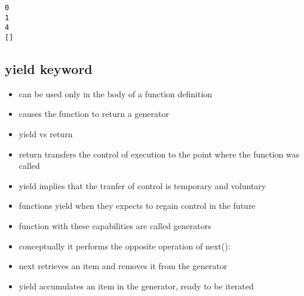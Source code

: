 \documentclass[11pt]{article}
\providecommand{\tightlist}{%
      \setlength{\itemsep}{0pt}\setlength{\parskip}{0pt}}
\begin{document}
    \begin{Verbatim}[commandchars=\\\{\}]
0
1
4
[]
    \end{Verbatim}

    \hypertarget{yield-keyword}{%
\subsection{yield keyword}\label{yield-keyword}}

\begin{itemize}
\tightlist
\item
  can be used only in the body of a function definition
\item
  causes the function to return a generator
\item
  yield vs return
\item
  return transfers the control of execution to the point where the
  function was called
\item
  yield implies that the tranfer of control is temporary and voluntary
\item
  functions yield when they expects to regain control in the future
\item
  function with these capabilities are called generators
\item
  conceptually it performs the opposite operation of next():
\item
  next retrieves an item and removes it from the generator
\item
  yield accumulates an item in the generator, ready to be iterated
\end{itemize}
\end{document}
